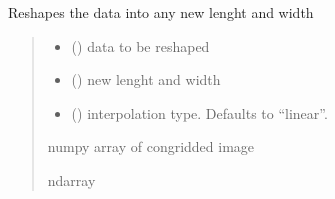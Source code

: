 \documentclass[letterpaper,10pt,english]{sphinxmanual}
\begin{document}
\begin{fulllineitems}
\label{\detokenize{micropolarray.processing:micropolarray.processing.congrid.congrid}}
\pysigstartsignatures
{}
\pysigstopsignatures
\sphinxAtStartPar
Reshapes the data into any new lenght and width
\begin{quote}\begin{description}
\begin{itemize}
\item {} 
\sphinxAtStartPar
{} () \textendash{} data to be reshaped

\item {} 
\sphinxAtStartPar
{} (\sphinxstyleliteralemphasis{\sphinxupquote{ | }}) \textendash{} new lenght and width

\item {} 
\sphinxAtStartPar
{} (\sphinxstyleliteralemphasis{\sphinxupquote{, }}) \textendash{} interpolation type. Defaults to “linear”.

\end{itemize}

\sphinxAtStartPar
numpy array of congridded image

\sphinxAtStartPar
ndarray

\end{description}\end{quote}

\end{fulllineitems}


\begin{fulllineitems}
\label{\detokenize{micropolarray.processing:micropolarray.processing.congrid.micropolarray_jitcongrid}}
\pysigstartsignatures
{}
\pysigstopsignatures
\end{fulllineitems}
\end{document}
